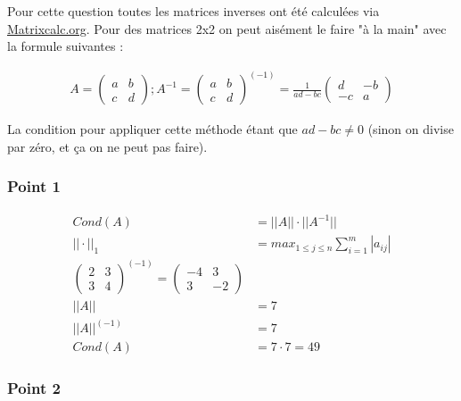 Pour cette question toutes les matrices inverses ont été calculées via \href{http://matrixcalc.org/en/}{Matrixcalc.org}. Pour des matrices 2x2 on peut aisément le faire "à la main" avec la formule suivantes :

\begin{equation}
	\begin{aligned}
		A = 
		\begin{pmatrix}
			a & b\\
			c & d
		\end{pmatrix}; A^{-1} = 
		\begin{pmatrix}
			a & b\\
			c & d
		\end{pmatrix}^{(-1)} = 
		\frac{1}{ad-bc}
		\begin{pmatrix}
			d & -b\\
			-c & a
		\end{pmatrix}
	\end{aligned}
\end{equation}

La condition pour appliquer cette méthode étant que $ad - bc \neq 0$ (sinon on divise par zéro, et ça on ne peut pas faire).

\subsubsection{Point 1}

\begin{equation}
	\begin{aligned}
		Cond (A) &= ||A|| \cdot ||A^{-1}||\\
		||\cdot||_1 &= max_{1 \leq j \leq n} \sum_{i=1}^m|a_{ij}|\\
		\begin{pmatrix}
			2 & 3\\
			3 & 4
		\end{pmatrix}^{(-1)} = 
		\begin{pmatrix}
			-4 & 3\\
			3 & -2
		\end{pmatrix}\\
			||A|| &= 7\\
			||A||^{(-1)} &= 7\\
			Cond (A) &= 7 \cdot 7 = 49
	\end{aligned}
\end{equation}

\subsubsection{Point 2}

